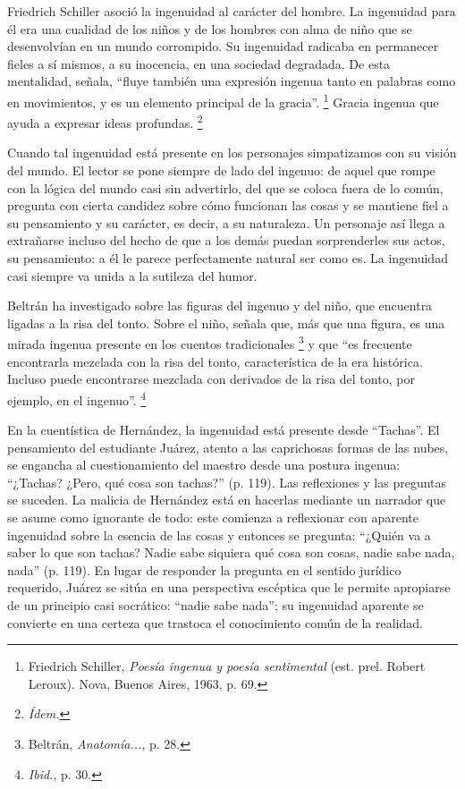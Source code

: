 \documentclass[14pt,twoside,final]{extbook} %
\let\oldfootnote\footnote
\renewcommand\footnote[1]{%
\oldfootnote{\hspace{1mm}#1}}
\begin{document}
Friedrich Schiller asoció la ingenuidad al carácter del hombre. La ingenuidad para él era una cualidad de los niños y de los hombres con alma de niño que se desenvolvían en un mundo corrompido. Su ingenuidad radicaba en permanecer fieles a sí mismos, a su inocencia, en una sociedad degradada. De esta mentalidad, señala, ``fluye también una expresión ingenua tanto en palabras como en movimientos, y es un elemento principal de la gracia''.\footnote{Friedrich Schiller, \emph{Poesía ingenua y poesía sentimental} (est. prel. Robert Leroux). Nova, Buenos Aires, 1963, p. 69.} Gracia ingenua que ayuda a expresar ideas profundas.\footnote{\em Ídem.}

Cuando tal ingenuidad está presente en los personajes simpatizamos con su visión del mundo. El lector se pone siempre de lado del ingenuo: de aquel que rompe con la lógica del mundo casi sin advertirlo, del que se coloca fuera de lo común, pregunta con cierta candidez sobre cómo funcionan las cosas y se mantiene fiel a su pensamiento y su carácter, es decir, a su naturaleza. Un personaje así llega a extrañarse incluso del hecho de que a los demás puedan sorprenderles sus actos, su pensamiento: a él le parece perfectamente natural ser como es. La ingenuidad casi siempre va unida a la sutileza del humor.

Beltrán ha investigado sobre las figuras del ingenuo y del niño, que encuentra ligadas a la risa del tonto. Sobre el niño, señala que, más que una figura, es una mirada ingenua presente en los cuentos tradicionales\footnote{Beltrán, \emph{Anatomía...}, p. 28.} y que ``es frecuente encontrarla mezclada con la risa del tonto, característica de la era histórica. Incluso puede encontrarse mezclada con derivados de la risa del tonto, por ejemplo, en el ingenuo''.\footnote{\emph{Ibid.}, p. 30.}

En la cuentística de Hernández, la ingenuidad está presente desde ``Tachas''. El pensamiento del estudiante Juárez, atento a las caprichosas formas de las nubes, se engancha al cuestionamiento del maestro desde una postura ingenua: ``¿Tachas? ¿Pero, qué cosa son tachas?'' (p. 119). Las reflexiones y las preguntas se suceden. La malicia de Hernández está en hacerlas mediante un narrador que se asume como ignorante de todo: este comienza a reflexionar con aparente ingenuidad sobre la esencia de las cosas y entonces se pregunta: ``¿Quién va a saber lo que son tachas? Nadie sabe siquiera qué cosa son cosas, nadie sabe nada, nada'' (p. 119). En lugar de responder la pregunta en el sentido jurídico
requerido, Juárez se sitúa en una perspectiva escéptica que le permite apropiarse de un principio casi socrático: ``nadie sabe nada''; su ingenuidad aparente se convierte en una certeza que trastoca el conocimiento común de la realidad.
\end{document}
